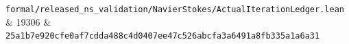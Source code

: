 \documentclass[10pt,a4paper]{article}
\begin{document}
{\begin{longtable}[]
\texttt{f\allowbreak{}o\allowbreak{}r\allowbreak{}m\allowbreak{}a\allowbreak{}l\allowbreak{}/\allowbreak{}r\allowbreak{}e\allowbreak{}l\allowbreak{}e\allowbreak{}a\allowbreak{}s\allowbreak{}e\allowbreak{}d\allowbreak{}\_\allowbreak{}n\allowbreak{}s\allowbreak{}\_\allowbreak{}v\allowbreak{}a\allowbreak{}l\allowbreak{}i\allowbreak{}d\allowbreak{}a\allowbreak{}t\allowbreak{}i\allowbreak{}o\allowbreak{}n\allowbreak{}/\allowbreak{}N\allowbreak{}a\allowbreak{}v\allowbreak{}i\allowbreak{}e\allowbreak{}r\allowbreak{}S\allowbreak{}t\allowbreak{}o\allowbreak{}k\allowbreak{}e\allowbreak{}s\allowbreak{}/\allowbreak{}A\allowbreak{}c\allowbreak{}t\allowbreak{}u\allowbreak{}a\allowbreak{}l\allowbreak{}I\allowbreak{}t\allowbreak{}e\allowbreak{}r\allowbreak{}a\allowbreak{}t\allowbreak{}i\allowbreak{}o\allowbreak{}n\allowbreak{}L\allowbreak{}e\allowbreak{}d\allowbreak{}g\allowbreak{}e\allowbreak{}r\allowbreak{}.\allowbreak{}l\allowbreak{}e\allowbreak{}a\allowbreak{}n} & {}19306 & \texttt{2\allowbreak{}5\allowbreak{}a\allowbreak{}1\allowbreak{}b\allowbreak{}7\allowbreak{}e\allowbreak{}9\allowbreak{}2\allowbreak{}0\allowbreak{}c\allowbreak{}f\allowbreak{}e\allowbreak{}0\allowbreak{}a\allowbreak{}f\allowbreak{}7\allowbreak{}c\allowbreak{}d\allowbreak{}d\allowbreak{}a\allowbreak{}4\allowbreak{}8\allowbreak{}8\allowbreak{}c\allowbreak{}4\allowbreak{}d\allowbreak{}0\allowbreak{}4\allowbreak{}0\allowbreak{}7\allowbreak{}e\allowbreak{}e\allowbreak{}4\allowbreak{}7\allowbreak{}c\allowbreak{}5\allowbreak{}2\allowbreak{}6\allowbreak{}a\allowbreak{}b\allowbreak{}c\allowbreak{}f\allowbreak{}a\allowbreak{}3\allowbreak{}a\allowbreak{}6\allowbreak{}4\allowbreak{}9\allowbreak{}1\allowbreak{}a\allowbreak{}8\allowbreak{}f\allowbreak{}b\allowbreak{}3\allowbreak{}3\allowbreak{}5\allowbreak{}a\allowbreak{}1\allowbreak{}a\allowbreak{}6\allowbreak{}a\allowbreak{}3\allowbreak{}1} \\

\end{longtable}}
\end{document}
